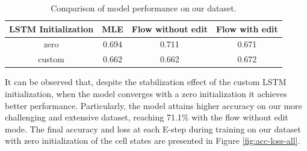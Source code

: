 \begin{table}[h!]
\centering
\begin{tabular}{|c|c|c|c|}
\hline
\textbf{LSTM Initialization} & \textbf{MLE} & \textbf{Flow without edit} & \textbf{Flow with edit} \\
\hline
zero   & 0.694 & 0.711 & 0.671 \\
custom & 0.662 & 0.662 & 0.672 \\
\hline
\end{tabular}
\caption{Comparison of model performance on our dataset.}
\end{table}

It can be observed that, despite the stabilization effect of the custom LSTM initialization, when the model converges with a zero initialization it achieves better performance.
Particularly, the model attains higher accuracy on our more challenging and extensive dataset, reaching 71.1\% with the flow without edit mode.
The final accuracy and loss at each E-step during training on our dataset with zero initialization of the cell states are presented in Figure \ref{fig:acc-loss-all}.

